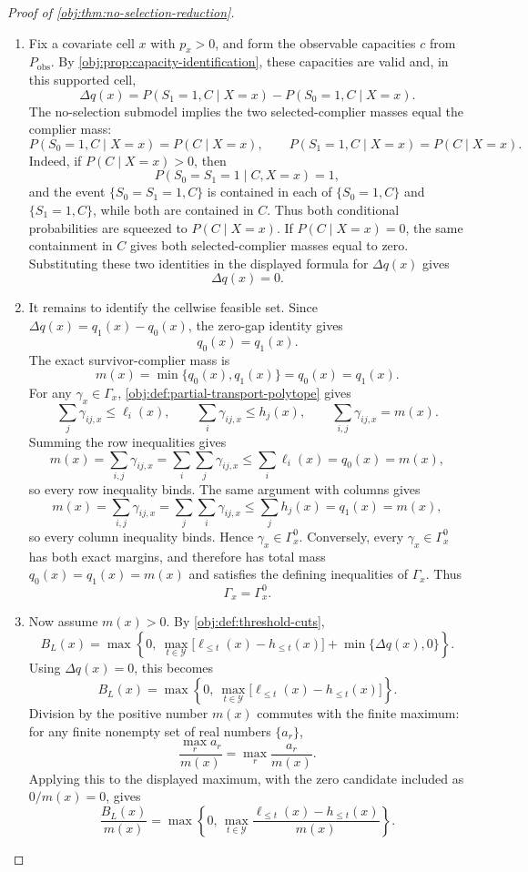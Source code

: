 \documentclass[11pt]{article}
\begin{document}
\begin{proof}[Proof of \cref{obj:thm:no-selection-reduction}]
\begin{enumerate}
\item
Fix a covariate cell \(x\) with \(p_x>0\), and form the observable capacities \(c\) from \(P_{\mathrm{obs}}\).  By \cref{obj:prop:capacity-identification}, these capacities are valid and, in this supported cell,
\[
\Delta q(x)
=
P(S_1=1,C\mid X=x)-P(S_0=1,C\mid X=x).
\]
The no-selection submodel implies the two selected-complier masses equal the complier mass:
\[
P(S_0=1,C\mid X=x)=P(C\mid X=x),
\qquad
P(S_1=1,C\mid X=x)=P(C\mid X=x).
\]
Indeed, if \(P(C\mid X=x)>0\), then
\[
P(S_0=S_1=1\mid C,X=x)=1,
\]
and the event \(\{S_0=S_1=1,C\}\) is contained in each of
\(\{S_0=1,C\}\) and \(\{S_1=1,C\}\), while both are contained in \(C\).
Thus both conditional probabilities are squeezed to \(P(C\mid X=x)\).
If \(P(C\mid X=x)=0\), the same containment in \(C\) gives both selected-complier masses equal to zero.  Substituting these two identities in the displayed formula for \(\Delta q(x)\) gives
\[
\Delta q(x)=0 .
\]

\item
It remains to identify the cellwise feasible set.  Since \(\Delta q(x)=q_1(x)-q_0(x)\), the zero-gap identity gives
\[
q_0(x)=q_1(x).
\]
The exact survivor-complier mass is
\[
m(x)=\min\{q_0(x),q_1(x)\}=q_0(x)=q_1(x).
\]
For any \(\gamma_x\in\Gamma_x\), \cref{obj:def:partial-transport-polytope} gives
\[
\sum_j\gamma_{ij,x}\le \ell_i(x),
\qquad
\sum_i\gamma_{ij,x}\le h_j(x),
\qquad
\sum_{i,j}\gamma_{ij,x}=m(x).
\]
Summing the row inequalities gives
\[
m(x)=\sum_{i,j}\gamma_{ij,x}
=\sum_i\sum_j\gamma_{ij,x}
\le \sum_i \ell_i(x)=q_0(x)=m(x),
\]
so every row inequality binds.  The same argument with columns gives
\[
m(x)=\sum_{i,j}\gamma_{ij,x}
=\sum_j\sum_i\gamma_{ij,x}
\le \sum_j h_j(x)=q_1(x)=m(x),
\]
so every column inequality binds.  Hence \(\gamma_x\in\Gamma_x^{0}\).  Conversely, every \(\gamma_x\in\Gamma_x^{0}\) has both exact margins, and therefore has total mass \(q_0(x)=q_1(x)=m(x)\) and satisfies the defining inequalities of \(\Gamma_x\).  Thus
\[
\Gamma_x=\Gamma_x^{0}.
\]

\item
Now assume \(m(x)>0\).  By \cref{obj:def:threshold-cuts},
\[
B_L(x)
=
\max\left\{
0,\
\max_{t\in\mathcal Y}\bigl[\ell_{\le t}(x)-h_{\le t}(x)\bigr]
+\min\{\Delta q(x),0\}
\right\}.
\]
Using \(\Delta q(x)=0\), this becomes
\[
B_L(x)
=
\max\left\{
0,\
\max_{t\in\mathcal Y}\bigl[\ell_{\le t}(x)-h_{\le t}(x)\bigr]
\right\}.
\]
Division by the positive number \(m(x)\) commutes with the finite maximum: for any finite nonempty set of real numbers \(\{a_r\}\),
\[
\frac{\max_r a_r}{m(x)}
=
\max_r \frac{a_r}{m(x)}.
\]
Applying this to the displayed maximum, with the zero candidate included as \(0/m(x)=0\), gives
\[
\frac{B_L(x)}{m(x)}
=
\max\left\{
0,\,
\max_{t\in\mathcal Y}
\frac{\ell_{\le t}(x)-h_{\le t}(x)}{m(x)}
\right\}.
\]


\end{enumerate}
\end{proof}
\end{document}
